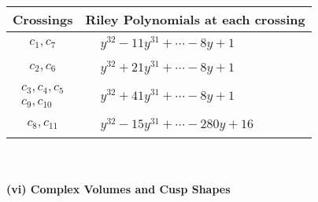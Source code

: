 \documentclass[1p]{elsarticle_modified}
\theoremstyle{definition}
\begin{document}
\begin{tabular}{m{50pt}|m{274pt}}
Crossings & \hspace{64pt}Riley Polynomials at each crossing \\
\hline $$\begin{aligned}c_{1},c_{7}\end{aligned}$$&$\begin{aligned}
&y^{32}-11 y^{31}+\cdots-8 y+1
\end{aligned}$\\
\hline $$\begin{aligned}c_{2},c_{6}\end{aligned}$$&$\begin{aligned}
&y^{32}+21 y^{31}+\cdots-8 y+1
\end{aligned}$\\
\hline $$\begin{aligned}c_{3},c_{4},c_{5}\\c_{9},c_{10}\end{aligned}$$&$\begin{aligned}
&y^{32}+41 y^{31}+\cdots-8 y+1
\end{aligned}$\\
\hline $$\begin{aligned}c_{8},c_{11}\end{aligned}$$&$\begin{aligned}
&y^{32}-15 y^{31}+\cdots-280 y+16
\end{aligned}$\\
\hline
\end{tabular}\\~\\
\newpage\flushleft \textbf{(vi) Complex Volumes and Cusp Shapes}
\end{document}
